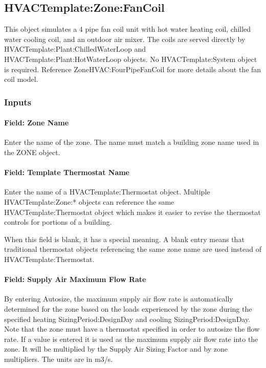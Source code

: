 \subsection{HVACTemplate:Zone:FanCoil}\label{hvactemplatezonefancoil}

This object simulates a 4 pipe fan coil unit with hot water heating coil, chilled water cooling coil, and an outdoor air mixer. The coils are served directly by HVACTemplate:Plant:ChilledWaterLoop and HVACTemplate:Plant:HotWaterLoop objects. No HVACTemplate:System object is required. Reference ZoneHVAC:FourPipeFanCoil for more details about the fan coil model.

\subsubsection{Inputs}\label{inputs-3-018}

\paragraph{Field: Zone Name}\label{field-zone-name-2-002}

Enter the name of the zone. The name must match a building zone name used in the ZONE object.

\paragraph{Field: Template Thermostat Name}\label{field-template-thermostat-name-2}

Enter the name of a HVACTemplate:Thermostat object. Multiple HVACTemplate:Zone:* objects can reference the same HVACTemplate:Thermostat object which makes it easier to revise the thermostat controls for portions of a building.

When this field is blank, it has a special meaning. A blank entry means that traditional thermostat objects referencing the same zone name are used instead of HVACTemplate:Thermostat.

\paragraph{Field: Supply Air Maximum Flow Rate}\label{field-supply-air-maximum-flow-rate}

By entering Autosize, the maximum supply air flow rate is automatically determined for the zone based on the loads experienced by the zone during the specified heating SizingPeriod:DesignDay and cooling SizingPeriod:DesignDay. Note that the zone must have a thermostat specified in order to autosize the flow rate. If a value is entered it is used as the maximum supply air flow rate into the zone. It will be multiplied by the Supply Air Sizing Factor and by zone multipliers. The units are in m3/s.

